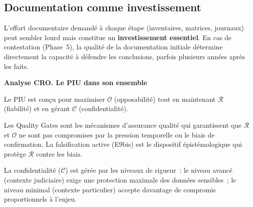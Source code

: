 \subsection{Documentation comme investissement}

L'effort documentaire demandé à chaque étape (inventaires, matrices, journaux)
peut sembler lourd mais constitue un \textbf{investissement essentiel}.
En cas de contestation (Phase~5), la qualité de la documentation initiale
détermine directement la capacité à défendre les conclusions, parfois plusieurs
années après les faits.

\begin{boxCRO}
\textbf{Analyse CRO. Le PIU dans son ensemble}

Le PIU est conçu pour maximiser $\mathcal{O}$ (opposabilité) tout en
maintenant $\mathcal{R}$ (fiabilité) et en gérant $\mathcal{C}$ (confidentialité).

Les Quality Gates sont les mécanismes d'assurance qualité qui garantissent
que $\mathcal{R}$ et $\mathcal{O}$ ne sont pas compromises par la pression
temporelle ou le biais de confirmation. La falsification active (E9bis) est
le dispositif épistémologique qui protège $\mathcal{R}$ contre les biais.

La confidentialité ($\mathcal{C}$) est gérée par les niveaux de rigueur~:
le niveau avancé (contexte judiciaire) exige une protection maximale des
données sensibles~; le niveau minimal (contexte particulier) accepte
davantage de compromis proportionnels à l'enjeu.

\end{boxCRO}

\separateur

